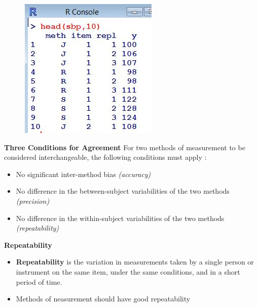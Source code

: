 \documentclass[compress]{beamer}        %
\makeatletter
\newcommand{\tcb}{\textcolor{beamer@blendedblue}}
\makeatother
\begin{document}
	\begin{frame}
		\begin{figure}
\centering
\includegraphics[width=0.55\linewidth]{images/sbphead}

\end{figure}

	\end{frame}
		\begin{frame}{\bf \tcb{Three Conditions for Agreement}}
			\Large
			For two methods of measurement to be considered interchangeable, the following conditions must apply \cite{Roy2009}:
			\\
			\begin{itemize}\itemsep0.5cm
				\item No significant inter-method bias \textit{(accuracy)}
				\item No difference in the between-subject variabilities of the two methods \textit{(precision)}
				\item No difference in the within-subject variabilities of the two methods \textit{(repeatability)}
			\end{itemize}
		\end{frame}
		
\begin{frame}
\Large
\noindent \textbf{Repeatability}
\begin{itemize}
\item \textbf{Repeatability}  is the variation in measurements taken by a single person or instrument on the same item, under the same conditions, and in a short period of time.
\item Methods of neasurement should have good repeatability
\end{itemize}
\end{frame}
		
\end{document}
